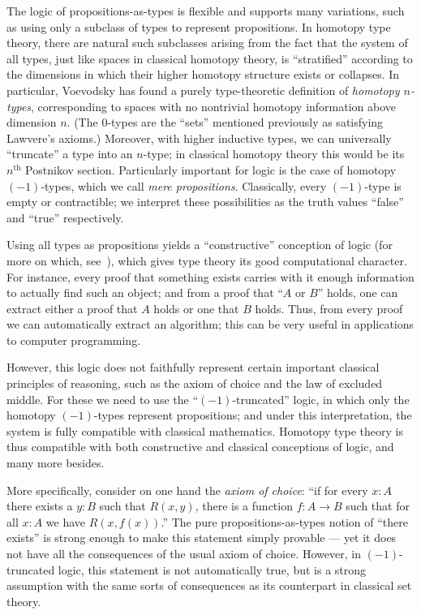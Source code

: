 The logic of propositions-as-types is flexible and supports many variations, such as using only a subclass of types to represent propositions.
In homotopy type theory, there are natural such subclasses arising from the fact that the system of all types, just like spaces in classical homotopy theory, is ``stratified'' according to the dimensions in which their higher homotopy structure exists or collapses.
In particular, Voevodsky has found a purely type-theoretic definition of \emph{homotopy $n$-types}, corresponding to spaces with no nontrivial homotopy information above dimension $n$.
(The $0$-types are the ``sets'' mentioned previously as satisfying Lawvere's axioms.)
Moreover, with higher inductive types, we can universally ``truncate'' a type into an $n$-type; in classical homotopy theory this would be its $n^{\mathrm{th}}$ Postnikov section.
Particularly important for logic is the case of homotopy $(-1)$-types, which we call \emph{mere propositions}.
Classically, every $(-1)$-type is empty or contractible; we interpret these possibilities as the truth values ``false'' and ``true'' respectively.

Using all types as propositions yields a ``constructive'' conception of logic (for more on which, see~\cite{kolmogorov,TroelstraI,TroelstraII}), which gives type theory its good 
computational character.
For instance, every proof that something exists carries with it enough information to actually find such an object; and from a proof that  ``$A$ or $B$'' holds, one can extract either a proof that $A$ holds or one that $B$ holds.
Thus, from every proof we can automatically extract an algorithm;  this can be very useful in applications to computer programming.

However, this logic does not faithfully represent certain important classical principles of reasoning, such as the axiom of choice and the law of excluded middle.
For these we need to use the ``$(-1)$-truncated'' logic, in which only the homotopy $(-1)$-types represent propositions; and under this interpretation, the system is fully compatible with classical mathematics.
Homotopy type theory is thus compatible with both constructive and classical conceptions of logic, and many more besides.

%
More specifically, consider on one hand the \emph{axiom of choice}: ``if for every $x: A$ there exists a $y:B$ such that $R(x,y)$, there is a function $f : A\to B$ such that for all $x:A$ we have $R(x, f(x))$.''
The pure propositions-as-types notion of ``there exists'' is strong enough to make this statement simply provable --- yet it does not have all the consequences of the usual axiom of choice.
However, in $(-1)$-truncated logic, this statement is not automatically true, but is a strong assumption with the same sorts of consequences as its counterpart in classical set theory.

